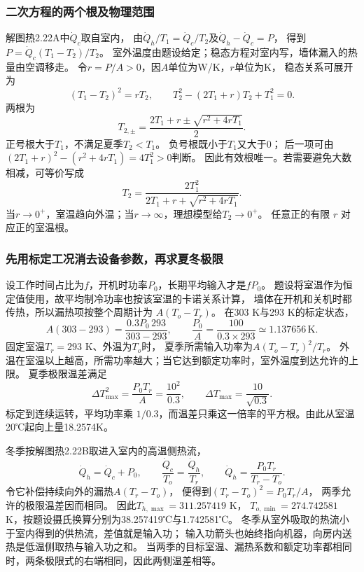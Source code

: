 \documentclass[UTF8,fontset=fandol,a4paper,11pt]{ctexart}
\begin{document}
\subsubsection*{二次方程的两个根及物理范围}
解图热2.22A中$\dot Q_c$取自室内，
由$\dot Q_h/T_1=\dot Q_c/T_2$及$\dot Q_h-\dot Q_c=P$，
得到$P=\dot Q_c(T_1-T_2)/T_2$。
室外温度由题设给定；稳态方程对室内写，墙体漏入的热量由空调移走。
令$r=P/A>0$，因$A$单位为W/K，$r$单位为K，
稳态关系可展开为
\[
(T_1-T_2)^2=rT_2,\qquad
T_2^2-(2T_1+r)T_2+T_1^2=0.
\]
两根为
\[
T_{2,\pm}=\frac{2T_1+r\pm\sqrt{r^2+4rT_1}}2.
\]
正号根大于$T_1$，不满足夏季$T_2<T_1$。
负号根既小于$T_1$又大于0；
后一项可由$(2T_1+r)^2-(r^2+4rT_1)=4T_1^2>0$判断。
因此有效根唯一。若需要避免大数相减，可等价写成
\[
T_2=\frac{2T_1^2}{2T_1+r+\sqrt{r^2+4rT_1}}.
\]
当$r\to0^+$，室温趋向外温；当$r\to\infty$，理想模型给$T_2\to0^+$。
任意正的有限 $r$ 对应正的室温根。

\subsubsection*{先用标定工况消去设备参数，再求夏冬极限}
设工作时间占比为$f$，开机时功率$P_0$，长期平均输入才是$fP_0$。
题设将室温作为恒定值使用，故平均制冷功率也按该室温的卡诺关系计算，
墙体在开机和关机时都传热，所以漏热项按整个周期计为 $A(T_o-T_r)$。
在303 K与293 K的标定状态，
\[
A(303-293)=\frac{0.3P_0\,293}{303-293},\qquad
\frac{P_0}{A}=\frac{100}{0.3\times293}
\simeq1.137656\,\mathrm K.
\]
固定室温$T_r=293$ K、外温为$T_o$时，
夏季所需输入功率为$A(T_o-T_r)^2/T_r$。
外温在室温以上越高，所需功率越大；当它达到额定功率时，室外温度到达允许的上限。
夏季极限温差满足
\[
\Delta T_{\max}^2=\frac{P_0T_r}{A}
=\frac{10^2}{0.3},\qquad
\Delta T_{\max}=\frac{10}{\sqrt{0.3}}.
\]
标定到连续运转，平均功率乘 $1/0.3$，而温差只乘这一倍率的平方根。由此从室温20℃起向上量18.2574K。

冬季按解图热2.22B取进入室内的高温侧热流，
\[
\dot Q_h=\dot Q_c+P_0,\qquad
\frac{\dot Q_c}{T_o}=\frac{\dot Q_h}{T_r},\qquad
\dot Q_h=\frac{P_0T_r}{T_r-T_o}.
\]
令它补偿持续向外的漏热$A(T_r-T_o)$，
便得到$(T_r-T_o)^2=P_0T_r/A$，
两季允许的极限温差因而相同。
因此$T_{h,\max}=311.257419$ K，
$T_{o,\min}=274.742581$ K，按题设摄氏换算分别为38.257419℃与1.742581℃。
冬季从室外吸取的热流小于室内得到的供热流，差值就是输入功；
输入功箭头也始终指向机器，向房内送热是低温侧取热与输入功之和。
当两季的目标室温、漏热系数和额定功率都相同时，两条极限式的右端相同，因此两侧温差相等。



\end{document}

